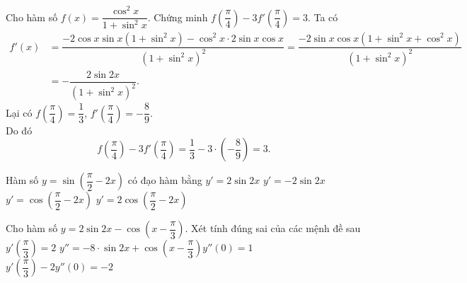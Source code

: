 \begin{bt}%
Cho hàm số $f(x)=\dfrac{\cos^2 x}{1+\sin^2 x}$. Chứng minh $f\left(\dfrac{\pi}{4}\right)-3f'\left(\dfrac{\pi}{4}\right)=3$.
	\loigiai
	{
		Ta có
		\begin{align*}
		f'(x) &=\dfrac{-2\cos x\sin x\left(1+\sin^2 x\right)-\cos^2 x\cdot 2\sin x\cos x}{\left(1+\sin^2 x\right)^2} = \dfrac{-2\sin x\cos x\left(1+\sin^2 x+\cos^2 x\right)}{\left(1+\sin^2 x\right)^2}\\
		&=-\dfrac{2\sin 2x}{\left(1+\sin^2 x\right)^2}.
		\end{align*}
		Lại có $f\left(\dfrac{\pi}{4}\right)=\dfrac{1}{3}$, $f'\left(\dfrac{\pi}{4}\right)=-\dfrac{8}{9}$.\\
		Do đó
		\[f\left(\dfrac{\pi}{4}\right)-3f'\left(\dfrac{\pi}{4}\right) = \dfrac{1}{3}-3\cdot \left(-\dfrac{8}{9}\right) = 3.\]
	}
\end{bt}

\begin{ex}%
	Hàm số $y = \sin \left( \dfrac{\pi  }{2} - 2x \right)$ có đạo hàm bằng
	\choice 
		{$y'  = 2\sin 2x$}
		{\True $y' = - 2\sin 2x$} 
		{$y'  = \cos \left( \dfrac{\pi }{2} - 2x \right)$}
		{$y' = 2\cos \left( \dfrac{\pi }{2}  - 2x \right)$}
\end{ex}

\begin{ex}%
 Cho hàm số $y=2\sin 2x-\cos\left(x-\dfrac{\pi}{3}\right)$. Xét tính đúng sai  của các mệnh đề sau
  \choiceTF
   {$y'\left(\dfrac{\pi}{3} \right)=2$}
  {\True $y''=-8\cdot\sin 2x+\cos\left(x-\dfrac{\pi}{3}\right)$}{$y''(0)=1$} 
  {$y'\left(\dfrac{\pi}{3}\right)-2y''(0)=-2$} 
\end{ex}

